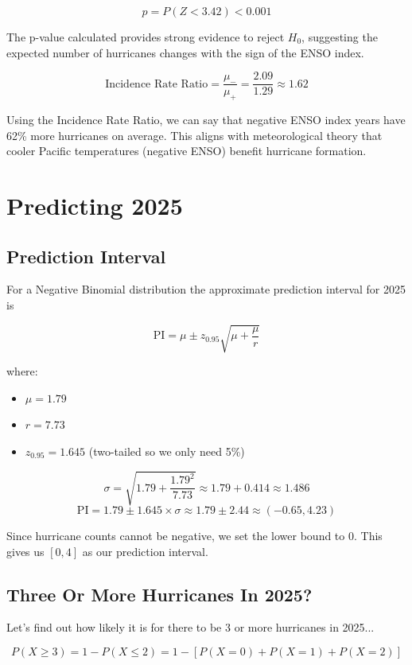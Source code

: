\documentclass[11pt,spanish]{report}
\begin{document}
    \[p=P(Z<3.42)<0.001\]

    The p-value calculated provides strong evidence to reject $H_{0}$, suggesting the expected number of hurricanes changes with the sign of the ENSO index.
    
    \[\text{Incidence Rate Ratio}=\frac{\mu_{-}}{\mu_{+}}=\frac{2.09}{1.29}\approx1.62\]

    Using the Incidence Rate Ratio, we can say that negative ENSO index years have 62\% more hurricanes on average. This aligns with meteorological theory that cooler Pacific temperatures (negative ENSO) benefit hurricane formation.
    
    \chapter{Predicting 2025}

    \section{Prediction Interval}

    For a Negative Binomial distribution the approximate prediction interval for 2025 is

    \[\text{PI}=\mu\pm z_{0.95}\sqrt{\mu+\frac{\mu}{r}}\]

    where:

    \begin{itemize}
        \item $\mu=1.79$
        \item $r=7.73$
        \item $z_{0.95}=1.645$ (two-tailed so we only need 5\%)
    \end{itemize}

    \[\sigma=\sqrt{1.79+\frac{1.79^{2}}{7.73}}\approx1.79+0.414\approx1.486\]
    \[\text{PI}=1.79\pm1.645\times\sigma\approx1.79\pm2.44\approx(-0.65,4.23)\]

    Since hurricane counts cannot be negative, we set the lower bound to 0. This gives us $[0,4]$ as our prediction interval.

    \section{Three Or More Hurricanes In 2025?}

    Let's find out how likely it is for there to be 3 or more hurricanes in 2025...

    \[P(X\geq3)=1-P(X\leq2)=1-[P(X=0)+P(X=1)+P(X=2)]\]
\end{document}
